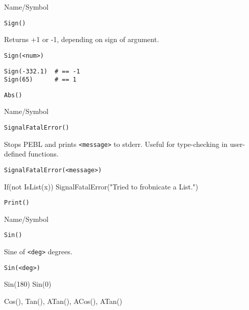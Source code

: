 \begin{desc}{Name/Symbol}
\item[Name/Symbol] 	\verb+Sign()+

\item[Description] 	Returns +1 or -1, depending on sign of argument.

\item[Usage]
\begin{verbatim}
Sign(<num>)
\end{verbatim}

\item[Example]
\begin{verbatim}
Sign(-332.1)  # == -1
Sign(65)      # == 1

\end{verbatim}

\item[See Also]     	\verb+Abs()+
\end{desc}

\rl


\begin{desc}{Name/Symbol}
\item[Name/Symbol] 	\verb+SignalFatalError()+

\item[Description] Stops PEBL and prints \verb+<message>+ to stderr.
  Useful for type-checking in user-defined functions.

\item[Usage]
\begin{verbatim}
SignalFatalError(<message>)
\end{verbatim}
If(not IsList(x))
{
 SignalFatalError("Tried to frobnicate a List.")
}
\item[Example]

\item[See Also]     	\verb+Print()+
\end{desc}

\rl


\begin{desc}{Name/Symbol}
\item[Name/Symbol]  	\verb+Sin()+

\item[Description]  	Sine of \verb+<deg>+ degrees.

\item[Usage]        	
\begin{verbatim}
Sin(<deg>)
\end{verbatim}
Sin(180)
Sin(0)
\item[Example]

\item[See Also]    	Cos(), Tan(), ATan(), ACos(), ATan() 
\end{desc}

